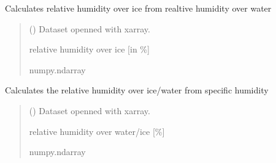 \documentclass[a4paper,11pt,english]{sphinxmanual}
\begin{document}
\begin{fulllineitems}
\label{\detokenize{modules:envlib.calc_altrv_vars.get_rh_ice}}
\pysigstartsignatures
{}
\pysigstopsignatures
\sphinxAtStartPar
Calculates relative humidity over ice from realtive humidity over water
\begin{quote}\begin{description}
\sphinxAtStartPar
{} () \textendash{} Dataset openned with xarray.

\sphinxAtStartPar
relative humidity over ice {[}in \%{]}

\sphinxAtStartPar
numpy.ndarray

\end{description}\end{quote}

\end{fulllineitems}


\begin{fulllineitems}
\label{\detokenize{modules:envlib.calc_altrv_vars.get_rh_sd}}
\pysigstartsignatures
{}
\pysigstopsignatures
\sphinxAtStartPar
Calculates the relative humidity over ice/water from specific humidity
\begin{quote}\begin{description}
\sphinxAtStartPar
{} () \textendash{} Dataset openned with xarray.

\sphinxAtStartPar
relative humidity over water/ice {[}\%{]}

\sphinxAtStartPar
numpy.ndarray

\end{description}\end{quote}

\end{fulllineitems}
\end{document}
